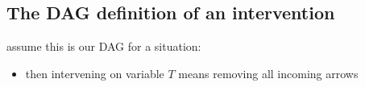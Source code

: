 \documentclass[
  letterpaper,
  DIV=11,
  numbers=noendperiod]{scrartcl}
\providecommand{\tightlist}{%
  \setlength{\itemsep}{0pt}\setlength{\parskip}{0pt}}\usepackage{longtable,booktabs,array}
\begin{document}
\subsection{The DAG definition of an
intervention}\label{the-dag-definition-of-an-intervention}

assume this is our DAG for a situation:

\begin{itemize}
\tightlist
\item
  then {intervening} on variable \(T\) means removing all incoming
  arrows
\end{itemize}

\begin{figure}

\begin{minipage}{0.50\linewidth}



\end{minipage}%
%
\begin{minipage}{0.50\linewidth}



\end{minipage}%

\end{figure}%
\end{document}
